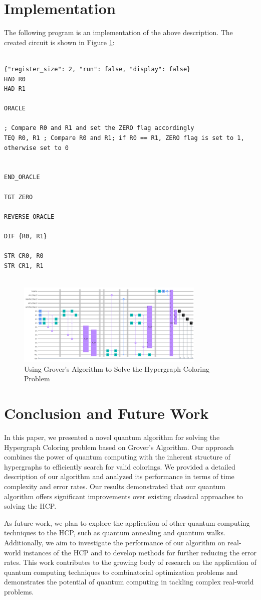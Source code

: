 \section{Implementation}

The following program is an implementation of the above description. The created circuit is shown in Figure \ref{fig:Hypergraph_Coloring}:

\begin{lstlisting}

{"register_size": 2, "run": false, "display": false}
HAD R0
HAD R1

ORACLE

; Compare R0 and R1 and set the ZERO flag accordingly
TEQ R0, R1 ; Compare R0 and R1; if R0 == R1, ZERO flag is set to 1, otherwise set to 0


END_ORACLE

TGT ZERO

REVERSE_ORACLE

DIF {R0, R1}

STR CR0, R0
STR CR1, R1


\end{lstlisting}

\begin{figure}[htp]
    \centering
    \includegraphics[width=9cm]{Figures/Hypergraph_Coloring_circuit.png}
    \caption{Using Grover's Algorithm to Solve the Hypergraph Coloring Problem}
    \label{fig:Hypergraph_Coloring}
\end{figure}

\section{Conclusion and Future Work}\label{sec:conclusion}
In this paper, we presented a novel quantum algorithm for solving the Hypergraph Coloring problem based on Grover's Algorithm. Our approach combines the power of quantum computing with the inherent structure of hypergraphs to efficiently search for valid colorings. We provided a detailed description of our algorithm and analyzed its performance in terms of time complexity and error rates. Our results demonstrated that our quantum algorithm offers significant improvements over existing classical approaches to solving the HCP.

As future work, we plan to explore the application of other quantum computing techniques to the HCP, such as quantum annealing and quantum walks. Additionally, we aim to investigate the performance of our algorithm on real-world instances of the HCP and to develop methods for further reducing the error rates. This work contributes to the growing body of research on the application of quantum computing techniques to combinatorial optimization problems and demonstrates the potential of quantum computing in tackling complex real-world problems.


